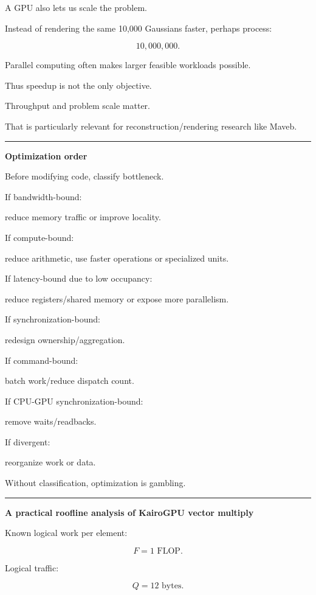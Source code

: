 A GPU also lets us scale the problem.

Instead of rendering the same 10,000 Gaussians faster, perhaps process:

\[
10,000,000.
\]

Parallel computing often makes larger feasible workloads possible.

Thus speedup is not the only objective.

Throughput and problem scale matter.

That is particularly relevant for reconstruction/rendering research like Maveb.

\begin{center}\rule{0.5\linewidth}{0.5pt}\end{center}

\textbf{Optimization order}

Before modifying code, classify bottleneck.

If bandwidth-bound:

reduce memory traffic or improve locality.

If compute-bound:

reduce arithmetic, use faster operations or specialized units.

If latency-bound due to low occupancy:

reduce registers/shared memory or expose more parallelism.

If synchronization-bound:

redesign ownership/aggregation.

If command-bound:

batch work/reduce dispatch count.

If CPU-GPU synchronization-bound:

remove waits/readbacks.

If divergent:

reorganize work or data.

Without classification, optimization is gambling.

\begin{center}\rule{0.5\linewidth}{0.5pt}\end{center}

\textbf{A practical roofline analysis of KairoGPU vector multiply}

Known logical work per element:

\[
F=1\text{ FLOP}.
\]

Logical traffic:

\[
Q=12\text{ bytes}.
\]

